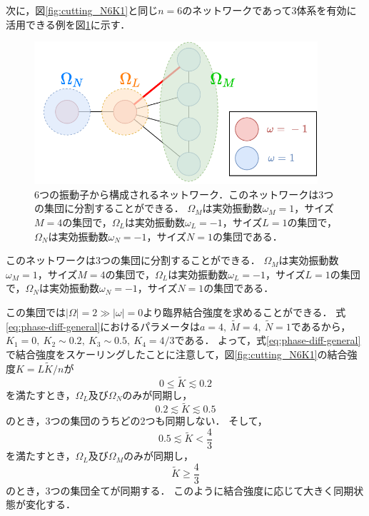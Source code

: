 \documentclass[../main]{subfiles}
\begin{document}
次に，図\ref{fig:cutting_N6K1}と同じ$n=6$のネットワークであって3体系を有効に活用できる例を図\ref{fig:3body-application}に示す．

\begin{figure}[tbp]
    \centering
    \includegraphics[width=105mm]{images/three-body-application.pdf}
    \centering
    \caption{6つの振動子から構成されるネットワーク．このネットワークは3つの集団に分割することができる．
    $\Omega_M$は実効振動数$\omega_M=1$，サイズ$M=4$の集団で，$\Omega_L$は実効振動数$\omega_L=-1$，サイズ$L=1$の集団で，$\Omega_N$は実効振動数$\omega_N=-1$，サイズ$N=1$の集団である．}
    \label{fig:3body-application}
\end{figure}

このネットワークは3つの集団に分割することができる．
$\Omega_M$は実効振動数$\omega_M=1$，サイズ$M=4$の集団で，$\Omega_L$は実効振動数$\omega_L=-1$，サイズ$L=1$の集団で，$\Omega_N$は実効振動数$\omega_N=-1$，サイズ$N=1$の集団である．

この集団では$|\Omega|=2\gg|\omega|=0$より臨界結合強度を求めることができる．
式\eqref{eq:phase-diff-general}におけるパラメータは$a=4,\ \tilde{M}=4,\ \tilde{N}=1$であるから，
$K_1=0,\ K_2\sim 0.2,\ K_3\sim 0.5,\ K_4=4/3$である．
よって，式\eqref{eq:phase-diff-general}で結合強度をスケーリングしたことに注意して，図\ref{fig:cutting_N6K1}の結合強度$K=L\tilde{K}/n$が
\begin{equation*}
    0\leq \tilde{K}\lesssim 0.2
\end{equation*}
を満たすとき，$\Omega_L$及び$\Omega_N$のみが同期し，
\begin{equation*}
    0.2\lesssim \tilde{K}\lesssim 0.5
\end{equation*}
のとき，3つの集団のうちどの2つも同期しない．
そして，
\begin{equation*}
    0.5\lesssim \tilde{K}<\frac{4}{3}
\end{equation*}
を満たすとき，$\Omega_L$及び$\Omega_M$のみが同期し，
\begin{equation*}
    \tilde{K}\geq \frac{4}{3}
\end{equation*}
のとき，3つの集団全てが同期する．
このように結合強度に応じて大きく同期状態が変化する．
\end{document}
